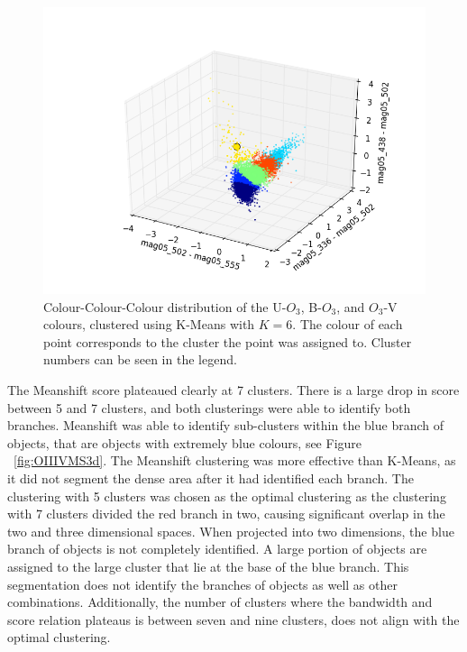 \begin{figure}
\centering
\includegraphics[width=\linewidth]{figs/unsuccessful/kmeans_3d_color_6cl_mag05_502-mag05_555vsmag05_336-mag05_502vsmag05_438-mag05_502}
\caption{Colour-Colour-Colour distribution of the U-$O_{3}$, B-$O_{3}$, and $O_{3}$-V colours, clustered using K-Means with $K=6$. The colour of each point corresponds to the cluster the point was assigned to. Cluster numbers can be seen in the legend.}
\label{fig:fig:OIIIVKM3d}
\end{figure}

The Meanshift score plateaued clearly at 7 clusters. There is a large drop in score between 5 and 7 clusters, and both clusterings were able to identify both branches.
Meanshift was able to identify sub-clusters within the blue branch of objects, that are objects with extremely blue colours, see Figure ~\ref{fig:OIIIVMS3d}.
The Meanshift clustering was more effective than K-Means, as it did not segment the dense area after it had identified each branch.
The clustering with 5 clusters was chosen as the optimal clustering as the clustering with 7 clusters divided the red branch in two, causing significant overlap in the two and three dimensional spaces.
When projected into two dimensions, the blue branch of objects is not completely identified.
A large portion of objects are assigned to the large cluster that lie at the base of the blue branch.
This segmentation does not identify the branches of objects as well as other combinations.
Additionally, the number of clusters where the bandwidth and score relation plateaus is between seven and nine clusters, does not align with the optimal clustering.

